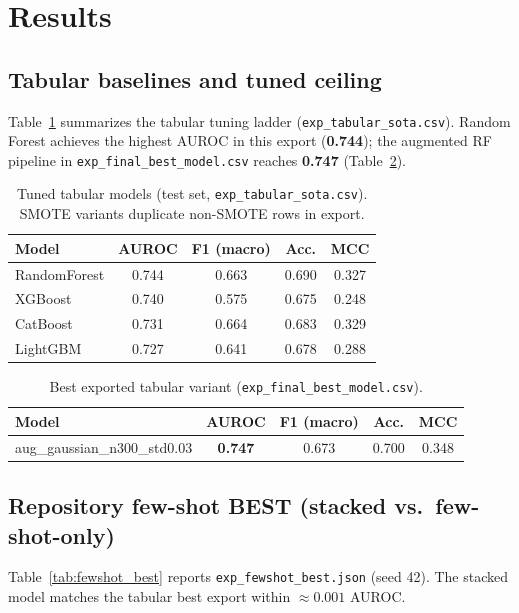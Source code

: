 \section{Results}
\label{sec:results}

\subsection{Tabular baselines and tuned ceiling}
Table~\ref{tab:tabular_sota} summarizes the tabular tuning ladder (\texttt{exp\_tabular\_sota.csv}). Random Forest achieves the highest AUROC in this export (\textbf{0.744}); the augmented RF pipeline in \texttt{exp\_final\_best\_model.csv} reaches \textbf{0.747} (Table~\ref{tab:final_best}).

\begin{table}[htbp]
  \centering
  \caption{Tuned tabular models (test set, \texttt{exp\_tabular\_sota.csv}). SMOTE variants duplicate non-SMOTE rows in export.}
  \label{tab:tabular_sota}
  \begin{tabular}{lcccc}
    \toprule
    Model & AUROC & F1 (macro) & Acc. & MCC \\
    \midrule
    RandomForest & 0.744 & 0.663 & 0.690 & 0.327 \\
    XGBoost & 0.740 & 0.575 & 0.675 & 0.248 \\
    CatBoost & 0.731 & 0.664 & 0.683 & 0.329 \\
    LightGBM & 0.727 & 0.641 & 0.678 & 0.288 \\
    \bottomrule
  \end{tabular}
\end{table}

\begin{table}[htbp]
  \centering
  \caption{Best exported tabular variant (\texttt{exp\_final\_best\_model.csv}).}
  \label{tab:final_best}
  \begin{tabular}{lcccc}
    \toprule
    Model & AUROC & F1 (macro) & Acc. & MCC \\
    \midrule
    aug\_gaussian\_n300\_std0.03 & \textbf{0.747} & 0.673 & 0.700 & 0.348 \\
    \bottomrule
  \end{tabular}
\end{table}

\subsection{Repository few-shot BEST (stacked vs.\ few-shot-only)}
Table~\ref{tab:fewshot_best} reports \texttt{exp\_fewshot\_best.json} (seed 42). The stacked model matches the tabular best export within $\approx 0.001$ AUROC.

